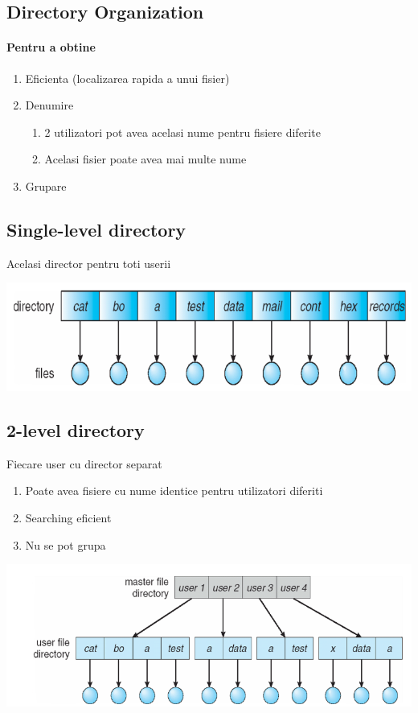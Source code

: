 \documentclass{article}
\begin{document}
\subsection*{Directory Organization}
\paragraph*{Pentru a obtine}
\begin{enumerate}
    \item Eficienta (localizarea rapida a unui fisier)
    \item Denumire
          \begin{enumerate}
              \item 2 utilizatori pot avea acelasi nume pentru fisiere diferite
              \item Acelasi fisier poate avea mai multe nume
          \end{enumerate}
    \item Grupare
\end{enumerate}

\subsection*{Single-level directory}
Acelasi director pentru toti userii
\begin{center}
    \includegraphics[scale=0.4]{42-sld.png}
\end{center}

\subsection*{2-level directory}
Fiecare user cu director separat
\begin{enumerate}
    \item Poate avea fisiere cu nume identice pentru utilizatori diferiti
    \item Searching eficient
    \item Nu se pot grupa
\end{enumerate}
\begin{center}
    \includegraphics[scale=0.4]{43-tld.png}
\end{center}
\end{document}
